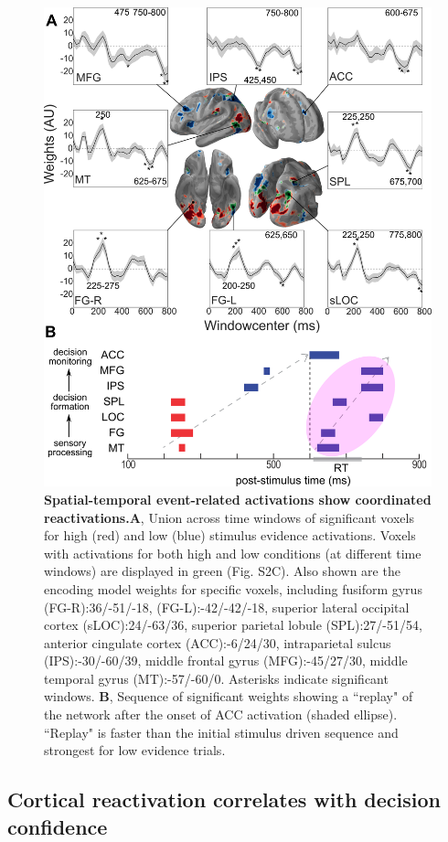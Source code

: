 \begin{figure}[htb!]
\centering
\includegraphics[width=.6\textwidth]{Fig6.png}
\caption{\textbf{Spatial-temporal event-related activations show coordinated reactivations.}\textbf{A}, Union across time windows of significant voxels for high (red) and low (blue) stimulus evidence activations. Voxels with activations for both high and low conditions (at different time windows) are displayed in green (Fig. S2C). Also shown are the encoding model weights for specific voxels, including fusiform gyrus (FG-R):36/-51/-18, (FG-L):-42/-42/-18, superior lateral occipital cortex (sLOC):24/-63/36, superior parietal lobule (SPL):27/-51/54, anterior cingulate cortex (ACC):-6/24/30, intraparietal sulcus (IPS):-30/-60/39, middle frontal gyrus (MFG):-45/27/30, middle temporal gyrus (MT):-57/-60/0. Asterisks indicate significant windows. \textbf{B}, Sequence of significant weights showing a ``replay" of the network after the onset of ACC activation (shaded ellipse). ``Replay" is faster than the initial stimulus driven sequence and strongest for low evidence trials.}
\label{fig:EncodingResults}
\end{figure}

\subsection*{Cortical reactivation correlates with decision confidence}

